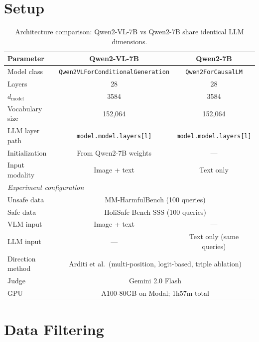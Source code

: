 \documentclass[11pt,a4paper]{article}
\begin{document}
\section{Setup}

\begin{table}[H]\centering
\caption{Architecture comparison: Qwen2-VL-7B vs Qwen2-7B share identical LLM dimensions.}
\begin{tabular}{lcc}
\toprule
\textbf{Parameter} & \textbf{Qwen2-VL-7B} & \textbf{Qwen2-7B} \\
\midrule
Model class & \texttt{Qwen2VLForConditionalGeneration} & \texttt{Qwen2ForCausalLM} \\
Layers & 28 & 28 \\
$d_\text{model}$ & 3584 & 3584 \\
Vocabulary size & 152,064 & 152,064 \\
LLM layer path & \texttt{model.model.layers[l]} & \texttt{model.model.layers[l]} \\
Initialization & From Qwen2-7B weights & --- \\
Input modality & Image + text & Text only \\
\midrule
\multicolumn{3}{l}{\textit{Experiment configuration}} \\
\midrule
Unsafe data & \multicolumn{2}{c}{MM-HarmfulBench (100 queries)} \\
Safe data & \multicolumn{2}{c}{HoliSafe-Bench SSS (100 queries)} \\
VLM input & Image + text & --- \\
LLM input & --- & Text only (same queries) \\
Direction method & \multicolumn{2}{c}{Arditi et al.\ (multi-position, logit-based, triple ablation)} \\
Judge & \multicolumn{2}{c}{Gemini 2.0 Flash} \\
GPU & \multicolumn{2}{c}{A100-80GB on Modal; 1h57m total} \\
\bottomrule
\end{tabular}
\end{table}

\section{Data Filtering}
\end{document}
